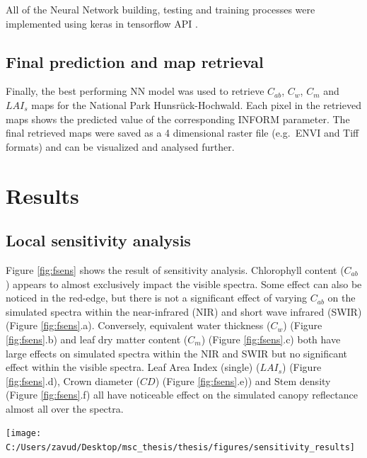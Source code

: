 \documentclass[a4paper, twoside]{templates/ociamthesis}
\let\origfigure\figure
\let\endorigfigure\endfigure
\renewenvironment{figure}[1][2] {
    \expandafter\origfigure\expandafter[H]
} {
    \endorigfigure
}
\begin{document}
All of the Neural Network building, testing and training processes were implemented using keras \citep{keras} in tensorflow API \citep{tensorflow}.

\hypertarget{final-prediction-and-map-retrieval}{%
\section{Final prediction and map retrieval}\label{final-prediction-and-map-retrieval}}

Finally, the best performing NN model was used to retrieve \(C_{ab}\), \(C_{w}\), \(C_{m}\) and \(LAI_{s}\) maps for the National Park Hunsrück-Hochwald. Each pixel in the retrieved maps shows the predicted value of the corresponding INFORM parameter. The final retrieved maps were saved as a 4 dimensional raster file (e.g.~ENVI and Tiff formats) and can be visualized and analysed further.

\hypertarget{results}{%
\chapter{Results}\label{results}}

\hypertarget{local-sensitivity-analysis-1}{%
\section{Local sensitivity analysis}\label{local-sensitivity-analysis-1}}

Figure \ref{fig:fsens} shows the result of sensitivity analysis. Chlorophyll content (\(C_{ab}\)) appears to almost exclusively impact the visible spectra. Some effect can also be noticed in the red-edge, but there is not a significant effect of varying \(C_{ab}\) on the simulated spectra within the near-infrared (NIR) and short wave infrared (SWIR) (Figure \ref{fig:fsens}.a). Conversely, equivalent water thickness (\(C_{w}\)) (Figure \ref{fig:fsens}.b) and leaf dry matter content (\(C_{m}\)) (Figure \ref{fig:fsens}.c) both have large effects on simulated spectra within the NIR and SWIR but no significant effect within the visible spectra. Leaf Area Index (single) (\(LAI_{s}\)) (Figure \ref{fig:fsens}.d), Crown diameter (\(CD\)) (Figure \ref{fig:fsens}.e)) and Stem density (Figure \ref{fig:fsens}.f) all have noticeable effect on the simulated canopy reflectance almost all over the spectra.

\newpage

\begin{figure}

{\centering \texttt{[image: C:/Users/zavud/Desktop/msc\_thesis/thesis/figures/sensitivity\_results]} 

}

\caption{Effects of varying the chosen parameters on the simulated spectra}\label{fig:fsens}
\end{figure}
\end{document}

